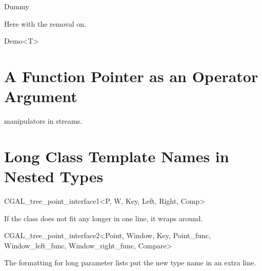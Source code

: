 \documentclass[12pt]{article}
\begin{document}
{\begin{ccClass}{Dummy}
\def\ccTagTemplateInline{\ccFalse}

Here with the removal on.

\def\ccTagRmTemplate{\ccTrue}


\def\ccTagRmTemplate{\ccFalse}
\end{ccClass}

\begin{ccClassTemplate}{Demo<T>}
\section{A Function Pointer as an Operator Argument}

\ccThreeToTwo

{manipulators in streams.}

\end{ccClassTemplate}

\section{Long Class Template Names in Nested Types}


\begin{ccClassTemplate}{CGAL_tree_point_interface1<P, W, Key,  
    Left, Right, Comp>}
\end{ccClassTemplate}

If the class does not fit any longer in one line, it wraps around.

\begin{ccClassTemplate}{CGAL_tree_point_interface2<Point, Window, Key,  
         Point_func, Window_left_func, 
         Window_right_func, Compare>}
\end{ccClassTemplate}

The formatting for long parameter lists put the new type name in an extra line.

}
\end{document}
